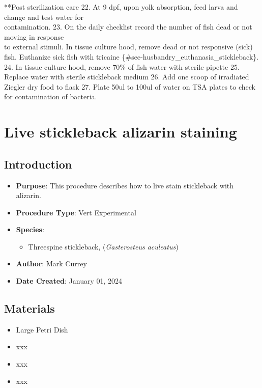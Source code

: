 \documentclass[
  letterpaper,
  DIV=11,
  numbers=noendperiod]{scrreprt}
\providecommand{\tightlist}{%
  \setlength{\itemsep}{0pt}\setlength{\parskip}{0pt}}\usepackage{longtable,booktabs,array}
\begin{document}
**Post sterilization care 22. At 9 dpf, upon yolk absorption, feed larva
and change and test water for\\
contamination. 23. On the daily checklist record the number of fish dead
or not moving in response\\
to external stimuli. In tissue culture hood, remove dead or not
responsive (sick) fish. Euthanize sick fish with tricaine
\{\#sec-husbandry\_euthanasia\_stickleback\}. 24. In tissue culture
hood, remove 70\% of fish water with sterile pipette 25. Replace water
with sterile stickleback medium 26. Add one scoop of irradiated Ziegler
dry food to flask 27. Plate 50ul to 100ul of water on TSA plates to
check for contamination of bacteria.

\hypertarget{sec-vert_exp-live_alizarin_SB}{%
\chapter{Live stickleback alizarin
staining}\label{sec-vert_exp-live_alizarin_SB}}

\hypertarget{introduction-77}{%
\section{Introduction}\label{introduction-77}}

\begin{itemize}
\tightlist
\item
  \textbf{Purpose}: This procedure describes how to live stain
  stickleback with alizarin.
\item
  \textbf{Procedure Type}: Vert Experimental
\item
  \textbf{Species}:

  \begin{itemize}
  \tightlist
  \item
    Threespine stickleback, (\emph{Gasterosteus aculeatus})
  \end{itemize}
\item
  \textbf{Author}: Mark Currey
\item
  \textbf{Date Created}: January 01, 2024
\end{itemize}

\hypertarget{materials-73}{%
\section{Materials}\label{materials-73}}

\begin{itemize}
\tightlist
\item
  Large Petri Dish
\item
  xxx
\item
  xxx
\item
  xxx
\end{itemize}
\end{document}
